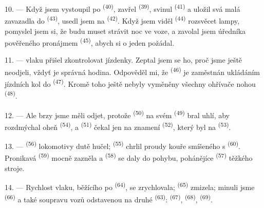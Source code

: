 \VUsaut{3.0mm}

10. --- Když jsem vystoupil po  \textsuperscript{(40)}, zavřel
 \textsuperscript{(39)}, svinul  \textsuperscript{(41)} a
uložil svá malá zavazadla do  \textsuperscript{(43)}, usedl jsem na
 \textsuperscript{(42)}. Když jsem viděl 
\textsuperscript{(44)} rozsvěcet lampy, pomyslel jsem si, že budu muset strávit noc ve voze, a
zavolal jsem úředníka pověřeného pronájmem  \textsuperscript{(45)}, abych
si o jeden požádal.

11. ---  vlaku přišel zkontrolovat jízdenky. Zeptal jsem se ho, proč jsme
ještě neodjeli, vždyť je správná hodina. Odpověděl mi, že 
\textsuperscript{(46)} je zaměstnán ukládáním jízdních kol do 
\textsuperscript{(47)}. Kromě toho ještě nebyly vyměněny všechny ohřívače nohou
\textsuperscript{(48)}.

12. --- Ale brzy jsme měli odjet, protože  \textsuperscript{(50)} na svém
 \textsuperscript{(49)} bral uhlí, aby rozdmýchal oheň
 \textsuperscript{(54)}, a 
\textsuperscript{(51)} čekal jen na znamení 
\textsuperscript{(52)}, který byl na  \textsuperscript{(53)}.

13. ---  \textsuperscript{(56)} lokomotivy dutě hučel; 
\textsuperscript{(55)} chrlil proudy kouře smíšeného s  \textsuperscript{(60)}.
Pronikavá  \textsuperscript{(59)} mocně zazněla a 
\textsuperscript{(58)} se daly do pohybu, pohánějíce  \textsuperscript{(57)}
těžkého stroje.

\VUsaut{3.0mm}
\VUsaut{3.0mm}

14. --- Rychlost vlaku, běžícího po  \textsuperscript{(64)}, se
zrychlovala;  \textsuperscript{(65)} zmizela; minuli jsme
 \textsuperscript{(66)} a také soupravu vozů odstavenou na druhé
 \textsuperscript{(63)}:  \textsuperscript{(67)},
 \textsuperscript{(68)}, 
\textsuperscript{(69)}.


